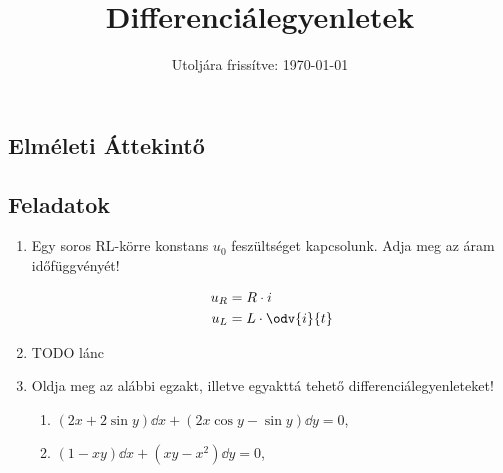 \documentclass[a4paper, 12pt, fleqn]{scrartcl}
\title{Differenciálegyenletek}
\date{Utoljára frissítve: \today}
\begin{document}
\maketitle

\subsection{Elméleti Áttekintő}

\clearpage
\subsection{Feladatok}

\begin{enumerate}
  \item Egy soros RL-körre konstans $u_0$ feszültséget kapcsolunk. Adja meg
        az áram időfüggvényét!

        \begin{minipage}{.25\textwidth}
          \centering
        \end{minipage}\begin{minipage}{.4\textwidth}
          \begin{align*}
            u_R & = R \cdot i
            \\
            u_L & = L \cdot \odv{i}{t}
          \end{align*}
        \end{minipage}

  \item TODO lánc

  \item Oldja meg az alábbi egzakt, illetve egyakttá tehető
        differenciálegyenleteket!
        \begin{enumerate}
          \item $\displaystyle
                  (2x + 2 \sin y) \dd x
                  + (2x \cos y - \sin y) \dd y
                  = 0
                $,
                \vspace{2mm}

          \item $\displaystyle
                  (1 - xy) \dd x
                  + (xy - x^2) \dd y
                  = 0
                $,


\end{enumerate}
\end{enumerate}
\end{document}

